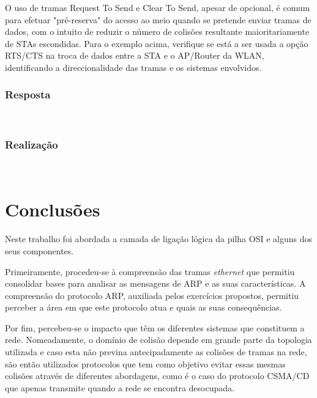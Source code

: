 \documentclass{llncs}
\begin{document}
O uso de tramas Request To Send e Clear To Send, apesar de opcional, é comum para efetuar "pré-reserva" do acesso ao meio quando se pretende enviar tramas de dados, com o intuito de reduzir o número de colisões resultante maioritariamente de STAs escondidas. Para o exemplo acima, verifique se está a ser usada a opção RTS/CTS na troca de dados entre a STA e o AP/Router da WLAN, identificando a direccionalidade das tramas e os sistemas envolvidos.

\subsubsection{Resposta}\rule[-10pt]{0pt}{10pt}\\



\subsubsection{Realização}\rule[-10pt]{0pt}{10pt}\\



\clearpage

\section{Conclusões}

\hspace{5mm} Neste trabalho foi abordada a camada de ligação lógica da pilha OSI e alguns dos seus componentes. 

Primeiramente, procedeu-se à compreensão das tramas \textit{ethernet} que permitiu consolidar bases para analisar as mensagens de ARP e as suas características. A compreensão do protocolo ARP, auxiliada pelos exercícios propostos, permitiu perceber a área em que este protocolo atua e quais as suas consequências.

Por fim, percebeu-se o impacto que têm os diferentes sistemas que constituem a rede. Nomeadamente, o domínio de colisão depende em grande parte da topologia utilizada e caso esta não previna antecipadamente as colisões de tramas na rede, são então utilizados protocolos que tem como objetivo evitar essas mesmas colisões através de diferentes abordagens, como é o caso do protocolo CSMA/CD que apenas transmite quando a rede se encontra desocupada.



\end{document}
